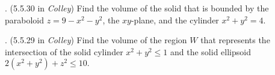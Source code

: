 \documentclass[11pt]{article}
\theoremstyle{definition}
\newcounter{prob}
\newcounter{subprob}
\newcommand\itm{\theprob.  \stepcounter{prob}\setcounter{subprob}{1}}
\newcommand\sol[2]{\iftoggle{solutions}{\begin{proof}[Solution] #1\end{proof}}{#2}}
\begin{document}
\iftoggle{solutions}{}{\newpage} 


\itm (5.5.30 in \textit{Colley}) Find the volume of the solid that is bounded by the paraboloid $z = 9 - x^2 - y^2$, the $xy$-plane, and the cylinder $x^2 + y^2 = 4$. 

\sol{
  To find the volume of the region, we integrate 1 over the region. We use cylindrical coordinates:
\begin{equation*}
  \text{volume} = \int_{0}^{2\pi} \!\int_0^2 \int_{0}^{9-r^2} 1 \,r\, dz \,dr\,d\theta =   (2\pi) \!\int_0^2(9-r^2)r\,dr. = \boxed{28\pi}. \qedhere
\end{equation*}
}{\vfill} 

\itm (5.5.29 in \textit{Colley}) Find the volume of the region $W$ that
represents the intersection of the solid cylinder $x^2+y^2 \leq 1$ and the
solid ellipsoid $2(x^2+y^2)+z^2\leq 10.$ 

\sol{We integrate in cylindrical coordinates: 
\[
\int_{0}^{1}\int_{0}^{2\pi}\int_{-\sqrt{10-2r^2}}^{\sqrt{10-2r^2}}\,r\,dz\,dr\,
d\theta = 2\pi \int_0^12r\sqrt{10-2r^2}\,dr = 
\boxed{\frac{4}{3} \sqrt{2} \left(5 \sqrt{5}-8\right) \pi}.\qedhere
\]}{\vfill}
\end{document}
